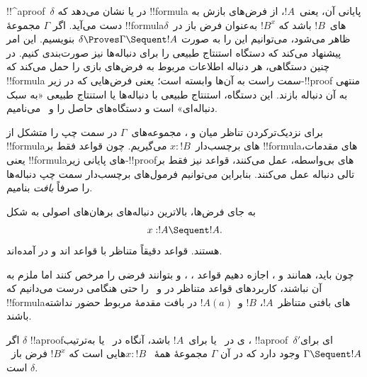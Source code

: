 \documentclass[../../../include/open-logic-section]{subfiles}
\begin{document}


!!^a{proof}~$\delta$ در  یا  نشان می‌دهد که
!!{formula} پایانی آن، یعنی~$!A$، از فرض‌های بازش به دست می‌آید. اگر
$\Gamma$ مجموعهٔ !!{formula}های~$!B$ باشد که $!B^x$ به‌عنوان فرض باز
در~$\delta$ ظاهر می‌شود، می‌توانیم این را به صورت
$\delta\Proves\Gamma\Sequent !A$ بنویسیم. این امر پیشنهاد می‌کند که
دستگاه استنتاج طبیعی را برای دنباله‌ها نیز صورت‌بندی کنیم. در چنین
دستگاهی، هر دنباله اطلاعات مربوط به فرض‌های بازی را حمل می‌کند که
!!{formula} سمت راست به آن‌ها وابسته است؛ یعنی فرض‌هایی که در
زیر-!!{proof} منتهی به آن دنباله بازند. این دستگاه، استنتاج طبیعی با
دنباله‌ها یا استنتاج طبیعی «به سبک دنباله‌ای» است و دستگاه‌های حاصل را
 و~ می‌نامیم.

برای نزدیک‌ترکردن تناظر میان  و ، مجموعه‌های~$\Gamma$
در سمت چپ را متشکل از !!{formula}های برچسب‌دار~$x:!B$ می‌گیریم. چون
قواعد  فقط بر !!{formula}های مقدمات، یعنی !!{formula}های پایانی
زیر-!!{proof}های بی‌واسطه، عمل می‌کنند، قواعد  نیز فقط بر تالی
دنباله عمل می‌کنند. بنابراین می‌توانیم فرمول‌های برچسب‌دار سمت چپ
دنباله‌ها را صرفاً \emph{بافت} بنامیم.

به جای فرض‌ها، بالاترین دنباله‌های برهان‌های  اصولی به شکل
\[x:!A \Sequent !A.\]
هستند. قواعد دقیقاً متناظر با قواعد اند و در 
آمده‌اند.



چون باید، همانند  و ، اجازه دهیم قواعد
\Intro{\lif}، \Intro{\lnot}، \Elim{\lor} و \Elim{\lexists} بتوانند
فرضی را مرخص کنند اما ملزم به آن نباشند، کاربردهای قواعد متناظر در
 و~ را حتی هنگامی درست می‌دانیم که !!{formula}های
بافتی متناظر~$!A$، $!B$ و~$!A(a)$ در بافت مقدمهٔ مربوط حضور نداشته
باشند.

\begin{prop}
اگر $\delta$ !!a{proof}ی در~ یا  برای~$!A$ باشد،
آنگاه در~ یا به‌ترتیب ، !!a{proof}~$\delta'$ای برای
$\Gamma\Sequent !A$ وجود دارد که در آن $\Gamma$ مجموعهٔ همهٔ
~$x:!B$هایی است که $!B^x$ فرض باز~$\delta$ است.
\end{prop}
\end{document}
